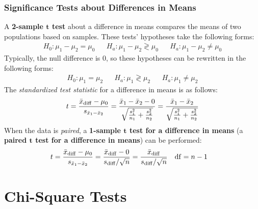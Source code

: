 \documentclass[../AP_Statistics.tex]{subfiles}
\begin{document}
			\subsection*{Significance Tests about Differences in Means}
				A \textbf{2-sample $\bm{t}$ test} about a difference in means compares the means of two populations based on samples. These tests' hypotheses take the following forms:
				\begin{align*}
					H_0: \mu_1 - \mu_2 = \mu_0 && H_a: \mu_1 - \mu_2 \gtrless \mu_0 && H_a: \mu_1 - \mu_2 \ne \mu_0
				\end{align*}
				Typically, the null difference is 0, so these hypotheses can be rewritten in the following forms:
				\begin{align*}
					H_0: \mu_1 = \mu_2 && H_a: \mu_1 \gtrless \mu_2 && H_a: \mu_1 \ne \mu_2
				\end{align*}
				The \emph{standardized test statistic} for a difference in means is as follows:
				\[t = \frac{\bar{x}_{\mathrm{diff}} - \mu_0}{s_{\bar{x}_1 - \bar{x}_2}} = \frac{\bar{x}_1 - \bar{x}_2 - 0}{\sqrt{\frac{s_1^2}{n_1} + \frac{s_2^2}{n_2}}} = \frac{\bar{x}_1 - \bar{x}_2}{\sqrt{\frac{s_1^2}{n_1} + \frac{s_2^2}{n_2}}}\]
				When the data is \emph{paired}, a \textbf{1-sample $\bm{t}$ test for a difference in means} (a \textbf{paired $\bm{t}$ test for a difference in means}) can be performed:
				\begin{align*}
					t &= \frac{\bar{x}_{\mathrm{diff}} - \mu_0}{s_{\bar{x}_1 - \bar{x}_2}} = \frac{\bar{x}_{\mathrm{diff}} - 0}{s_{\mathrm{diff}}/\sqrt{n}} = \frac{\bar{x}_{\mathrm{diff}}}{s_{\mathrm{diff}}/\sqrt{n}} & \operatorname{\mathrm{df}} &= n - 1
				\end{align*}
	\chapter{Chi-Square Tests}
\end{document}
